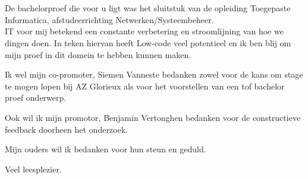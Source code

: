 
\chapter*{}
\label{ch:voorwoord}


De bachelorproef die voor u ligt was het sluitstuk van de opleiding Toegepaste Informatica, afstudeerrichting Netwerken/Systeembeheer.\\
IT voor mij betekend een constante verbetering en stroomlijning van hoe we dingen doen. In teken hiervan heeft Low-code veel potentieel en ik ben blij om mijn proef in dit domein te hebben kunnen maken.

Ik wel mijn co-promoter, Siemen Vanneste bedanken zowel voor de kans om stage te mogen lopen bij AZ Glorieux als voor het voorstellen van een tof bachelor proef onderwerp.

Ook wil ik mijn promotor, Benjamin Vertonghen bedanken voor de constructieve feedback doorheen het onderzoek.

Mijn ouders wil ik bedanken voor hun steun en geduld.

Veel leesplezier.
